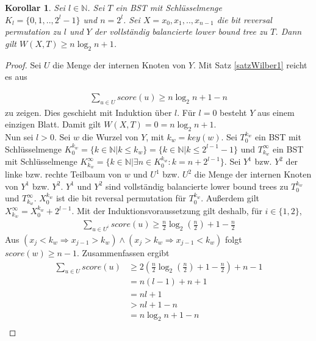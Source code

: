 \documentclass[a4paper,12pt]{article}
\begin{document}
\newtheorem{Korollar1}{Korollar}[section]
\begin{Korollar1} Sei $l \in \mathbb{N}$. Sei $T$ ein BST mit Schlüsselmenge\\ ${K_l = \{0,1,..,2^l -1\}}$ und $n = 2^l$. Sei $X = x_0, x_1,..,x_{n-1}$ die bit reversal permutation zu $l$ und $Y$ der vollständig balancierte lower bound tree zu $T$. Dann gilt  $W\left(X,T\right) \geq n \log_2 n + 1 $. 
\end{Korollar1}
\begin{proof}
Sei $U$ die Menge der internen Knoten von $Y$. Mit Satz \ref{satzWilber1} reicht es aus 

\begin{align*}
\sum_{u \in U} {\mathit{score}\left(u\right)} \geq n \log_2 n + 1 - n 
\end{align*} 
zu zeigen. Dies geschieht mit Induktion über $l$. Für $l = 0$ besteht $Y$ aus einem einzigen Blatt. Damit gilt $ W\left(X,T\right) = 0 = n \log_2 n + 1 $. \\
Nun sei $l > 0$. Sei $w$ die Wurzel von $Y$, mit $k_w = \mathit{key}(w)$. Sei $T_0^{k_w}$ ein BST mit Schlüsselmenge $K_0^{k_w} =\{k \in \mathbb{N}\vert k \leq k_w\} = \{k \in \mathbb{N}\vert k \leq 2^{l-1} - 1\}$ und $T_{k_w}^\infty$ ein BST mit Schlüsselmenge  $ K^\infty_{k_w} = \{k \in \mathbb{N}\vert \exists n \in K_0^{k_w}\colon  k = n + 2^{l-1}\}$. Sei $Y^1$ bzw. $Y^2$ der linke bzw. rechte Teilbaum von $w$ und $U^1$ bzw. $U^2$ die Menge der internen Knoten von $Y^1$ bzw. $Y^2$. $Y^1$ und $Y^2$ sind vollständig balancierte lower bound trees zu $T_0^{k_w}$ und $T_{k_w}^\infty$. $X^{k_w}_0$ ist die bit reversal permutation für $T_0^{k_w}$. Außerdem gilt $X_{k_w}^\infty = X^{k_w}_0 + 2^{l-1}$. Mit der Induktionsvoraussetzung gilt deshalb, für $i \in \{1,2\}$,
\begin{align*}
\sum_{u \in U^i} {\mathit{score}\left(u\right)} \geq  \frac{n}{2} \log_2 \left(\frac{n}{2} \right) + 1 - \frac{n}{2}  
\end{align*}
Aus $\left(x_j < k_w \Rightarrow x_{j-1} > k_w \right) \land \left(x_j > k_w \Rightarrow x_{j-1} < k_w \right)$ folgt $\mathit{score}\left(w\right) \geq n-1$. Zusammenfassen ergibt
\begin{align*}
\sum_{u \in U} {\mathit{score}\left(u\right)} &\geq 2 \left( \frac{n}{2}  \log_2 \left(\frac{n}{2} \right) + 1 - \frac{n}{2} \right) + n - 1\\	
&= n (l-1) + n + 1 \\
&= n l + 1 \\	
&> n l + 1 -n \\
&= n \log_2 n + 1 - n\\	
\end{align*}
		
\end{proof}
\end{document}

